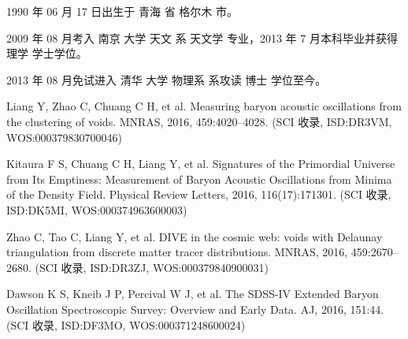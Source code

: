 \begin{resume}


  1990 年 06 月 17 日出生于 青海 省 格尔木 市。

  2009 年 08 月考入 南京 大学 天文 系 天文学 专业，2013 年 7 月本科毕业并获得 理学 学士学位。

  2013 年 08 月免试进入 清华 大学 物理系 系攻读 博士 学位至今。


  \begin{publications}
    \item Liang Y, Zhao C, Chuang C H, et al. Measuring baryon acoustic oscillations from the clustering of voids. MNRAS, 2016, 459:4020–4028. (SCI 收录, ISD:DR3VM, WOS:000379830700046)
  \end{publications}


  \begin{publications}
    \item Kitaura F S, Chuang C H, Liang Y, et al. Signatures of the Primordial Universe from Its Emptiness: Measurement of Baryon Acoustic Oscillations from Minima of the Density Field. Physical Review Letters, 2016, 116(17):171301. (SCI 收录, ISD:DK5MI, WOS:000374963600003)
    \item Zhao C, Tao C, Liang Y, et al. DIVE in the cosmic web: voids with Delaunay triangulation from discrete matter tracer distributions. MNRAS, 2016, 459:2670–2680. (SCI 收录, ISD:DR3ZJ, WOS:000379840900031)
    \item Dawson K S, Kneib J P, Percival W J, et al. The SDSS-IV Extended Baryon Oscillation Spectroscopic Survey: Overview and Early Data. AJ, 2016, 151:44. (SCI 收录, ISD:DF3MO, WOS:000371248600024)
  \end{publications}

\end{resume}
